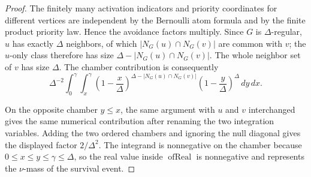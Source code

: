 \begin{proof}
The finitely many activation indicators and priority coordinates for
different vertices are independent by the Bernoulli atom formula and by the
finite product priority law.  Hence the avoidance factors multiply.  Since
\(G\) is \(\Delta\)-regular, \(u\) has exactly \(\Delta\) neighbors, of which
\(|N_G(u)\cap N_G(v)|\) are common with \(v\); the \(u\)-only class therefore
has size \(\Delta-|N_G(u)\cap N_G(v)|\).  The whole neighbor set of \(v\) has
size \(\Delta\).  The chamber contribution is consequently
\[
\Delta^{-2}\int_0^\gamma\int_x^\gamma
\left(1-\frac{x}{\Delta}\right)^{
\Delta-|N_G(u)\cap N_G(v)|}
\left(1-\frac{y}{\Delta}\right)^\Delta\,dy\,dx .
\]

On the opposite chamber \(y\le x\), the same argument with \(u\) and \(v\)
interchanged gives the same numerical contribution after renaming the two
integration variables.  Adding the two ordered chambers and ignoring the null
diagonal gives the displayed factor \(2/\Delta^2\).  The integrand is
nonnegative on the chamber because \(0\le x\le y\le\gamma\le\Delta\), so the
real value inside \(\operatorname{ofReal}\) is nonnegative and represents the
\(\nu\)-mass of the survival event.
\end{proof}
